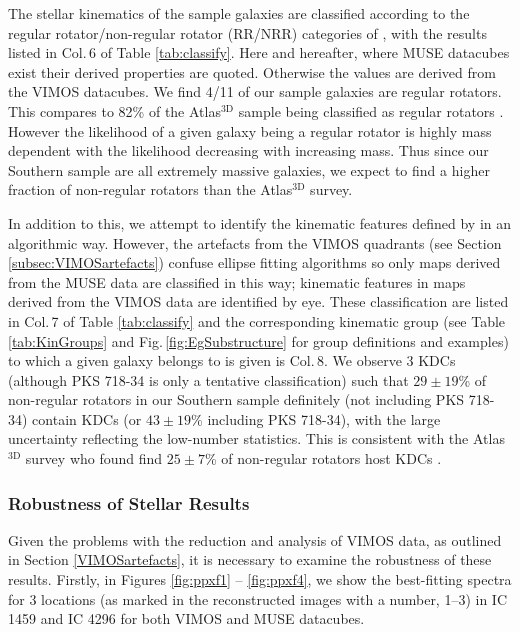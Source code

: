 		The stellar kinematics of the sample galaxies are classified according to the regular rotator/non-regular rotator (RR/NRR) categories of \citet{Krajnovic2011}, with the results listed in Col.\,6 of Table \ref{tab:classify}. Here and hereafter, where MUSE datacubes exist their derived properties are quoted. Otherwise the values are derived from the VIMOS datacubes. We find 4/11 of our sample galaxies are regular rotators. This compares to 82\% of the Atlas$^\text{3D}$ sample being classified as regular rotators \citep{Krajnovic2011}. However the likelihood of a given galaxy being a regular rotator is highly mass dependent with the likelihood decreasing with increasing mass. Thus since our Southern sample are all extremely massive galaxies, we expect to find a higher fraction of non-regular rotators than the Atlas$^\text{3D}$ survey. 

		In addition to this, we attempt to identify the kinematic features defined by \citet{Krajnovic2011} in an algorithmic way. However, the artefacts from the VIMOS quadrants (see Section \ref{subsec:VIMOSartefacts}) confuse ellipse fitting algorithms so only maps derived from the MUSE data are classified in this way; kinematic features in maps derived from the VIMOS data are identified by eye. These classification are listed in Col.\,7 of Table \ref{tab:classify} and the corresponding kinematic group (see Table \ref{tab:KinGroups} and Fig.\,\ref{fig:EgSubstructure} for group definitions and examples) to which a given galaxy belongs to is given is Col.\,8. We observe 3 KDCs (although PKS 718-34 is only a tentative classification) such that $29\pm19$\% of non-regular rotators in our Southern sample definitely (not including PKS 718-34) contain KDCs (or $43\pm19$\% including PKS 718-34), with the large uncertainty reflecting the low-number statistics. This is consistent with the Atlas$^\text{3D}$ survey who found find $25\pm7$\% of non-regular rotators host KDCs \citep{Krajnovic2011}.

		\subsubsection{Robustness of Stellar Results}
			\label{subsubsec:RobustKin}
			Given the problems with the reduction and analysis of VIMOS data, as outlined in Section \ref{VIMOSartefacts}, it is necessary to examine the robustness of these results. Firstly, in Figures \ref{fig:ppxf1} -- \ref{fig:ppxf4}, we show the best-fitting spectra for 3 locations (as marked in the reconstructed images with a number, 1--3) in IC 1459 and IC 4296 for both VIMOS and MUSE datacubes. 

